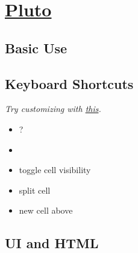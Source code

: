 \section{\href{https://plutojl.org/}{Pluto}}


\subsection*{Basic Use}


\subsection*{Keyboard Shortcuts}
\textit{Try customizing with \href{https://github.com/lucio-cornejo/custom-pluto}{this}.}

\begin{itemize}
	\item {} ?
	\item {} 
	\item {} toggle cell visibility 
	\item {} split cell
	\item {} new cell above
\end{itemize}


\subsection*{UI and HTML}


